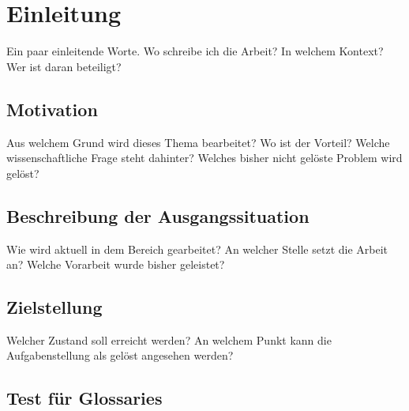 


\section{Einleitung}

Ein paar einleitende Worte. Wo schreibe ich die Arbeit? In welchem Kontext? Wer ist daran beteiligt?


	\subsection{Motivation}
	
	Aus welchem Grund wird dieses Thema bearbeitet? Wo ist der Vorteil? Welche wissenschaftliche Frage steht dahinter? Welches bisher nicht gelöste Problem wird gelöst?
	

	\subsection{Beschreibung der Ausgangssituation}
	
	Wie wird aktuell in dem Bereich gearbeitet? An welcher Stelle setzt die Arbeit an? Welche Vorarbeit wurde bisher geleistet?
	
	
	\subsection{Zielstellung} \label{sec:Zielstellung}
	
	Welcher Zustand soll erreicht werden? An welchem Punkt kann die Aufgabenstellung als gelöst angesehen werden?
	
	
	
	
	
	
\ifdefined\UseGlossaries					%
	\subsection{Test für Glossaries}
	
